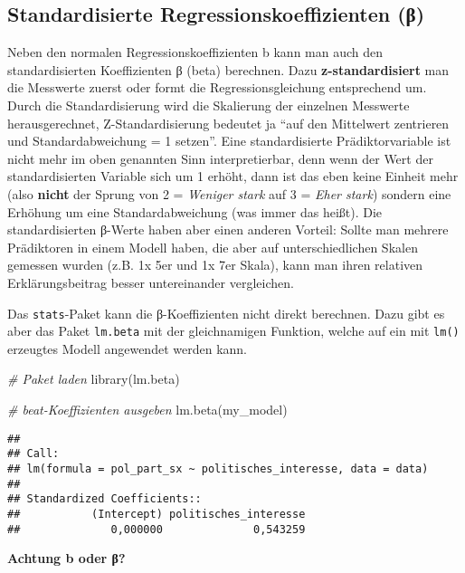 \documentclass[
]{book}
\newenvironment{Shaded}{\begin{snugshade}}{\end{snugshade}}
\newcommand{\CommentTok}[1]{\textcolor[rgb]{0.56,0.35,0.01}{\textit{#1}}}
\newcommand{\FunctionTok}[1]{\textcolor[rgb]{0.00,0.00,0.00}{#1}}
\newcommand{\NormalTok}[1]{#1}
\begin{document}
\hypertarget{standardisierte-regressionskoeffizienten-ux3b2}{%
\subsection{Standardisierte Regressionskoeffizienten (β)}\label{standardisierte-regressionskoeffizienten-ux3b2}}

Neben den normalen Regressionskoeffizienten b kann man auch den standardisierten Koeffizienten β (beta) berechnen. Dazu \textbf{z-standardisiert} man die Messwerte zuerst oder formt die Regressionsgleichung entsprechend um. Durch die Standardisierung wird die Skalierung der einzelnen Messwerte herausgerechnet, Z-Standardisierung bedeutet ja ``auf den Mittelwert zentrieren und Standardabweichung = 1 setzen''. Eine standardisierte Prädiktorvariable ist nicht mehr im oben genannten Sinn interpretierbar, denn wenn der Wert der standardisierten Variable sich um 1 erhöht, dann ist das eben keine Einheit mehr (also \textbf{nicht} der Sprung von 2 = \emph{Weniger stark} auf 3 = \emph{Eher stark}) sondern eine Erhöhung um eine Standardabweichung (was immer das heißt). Die standardisierten β-Werte haben aber einen anderen Vorteil: Sollte man mehrere Prädiktoren in einem Modell haben, die aber auf unterschiedlichen Skalen gemessen wurden (z.B. 1x 5er und 1x 7er Skala), kann man ihren relativen Erklärungsbeitrag besser untereinander vergleichen.

Das \texttt{stats}-Paket kann die β-Koeffizienten nicht direkt berechnen. Dazu gibt es aber das Paket \texttt{lm.beta} mit der gleichnamigen Funktion, welche auf ein mit \texttt{lm()} erzeugtes Modell angewendet werden kann.

\begin{Shaded}
\begin{Highlighting}[]
\CommentTok{\# Paket laden}
\FunctionTok{library}\NormalTok{(lm.beta)  }

\CommentTok{\# beat{-}Koeffizienten ausgeben}
\FunctionTok{lm.beta}\NormalTok{(my\_model) }
\end{Highlighting}
\end{Shaded}

\begin{verbatim}
## 
## Call:
## lm(formula = pol_part_sx ~ politisches_interesse, data = data)
## 
## Standardized Coefficients::
##           (Intercept) politisches_interesse 
##              0,000000              0,543259
\end{verbatim}

\leavevmode\hypertarget{info_beta}{}%
\textbf{Achtung b oder β?}
\end{document}
